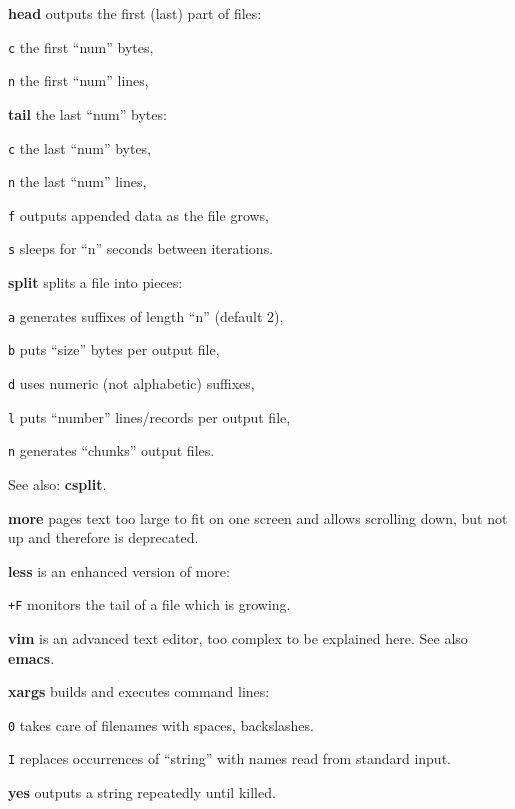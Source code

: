 \begin{enumx}
	\item [\cmdblack] \textbf{head} outputs the first (last) part of files:
	\item [\texttt{c}] the first ``num'' bytes,
	\item [\texttt{n}] the first ``num'' lines,
	\item [\cmdblack] \textbf{tail} the last ``num'' bytes:
	\item [\texttt{c}] the last ``num'' bytes,
	\item [\texttt{n}] the last ``num'' lines,
	\item [\texttt{f}] outputs appended data as the file grows,
	\item [\texttt{s}] sleeps for ``n'' seconds between iterations. 
	\item [\cmdblack] \textbf{split} splits a file into pieces:
	\item [\texttt{a}] generates suffixes of length ``n'' (default 2),
	\item [\texttt{b}] puts ``size'' bytes per output file,
	\item [\texttt{d}] uses numeric (not alphabetic) suffixes,
	\item [\texttt{l}] puts ``number'' lines/records per output file,
	\item [\texttt{n}] generates ``chunks'' output files.
	\item [\cmdblack] See also: \textbf{csplit}.
\end{enumx}

\begin{enumx}
	\item [\cmd] \textbf{more} pages text too large to fit on one screen and 
	allows scrolling down, but not up and therefore is deprecated.
	\item [\cmd] \textbf{less} is an enhanced version of more:
	\item [\texttt{+F}] monitors the tail of a file which is growing.
\end{enumx}

\begin{enumx}
	\item [\cmd] \textbf{vim} is an advanced text editor, 
	too complex to be explained here.
	See also \textbf{emacs}.
\end{enumx}

\begin{enumx}
	\item [\cmd] \textbf{xargs} builds and executes command lines:
	\item [\texttt{0}] takes care of filenames with spaces, backslashes.
	\item [\texttt{I}] replaces occurrences of ``string'' with names read from standard input.
\end{enumx}

\begin{enumx}
	\item [\cmd] \textbf{yes} outputs a string repeatedly until killed.
\end{enumx}
